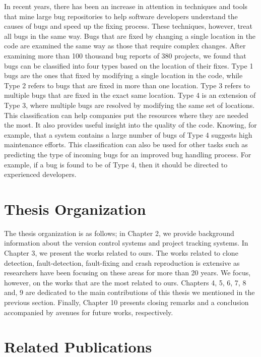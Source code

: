 \documentclass[12pt]{report}
\begin{document}
\begin{enumerate}
  In recent years, there has been an increase in attention in techniques
  and tools that mine large bug repositories to help software developers
  understand the causes of bugs and speed up the fixing process. These
  techniques, however, treat all bugs in the same way. Bugs that are
  fixed by changing a single location in the code are examined the same
  way as those that require complex changes. After examining more than
  100 thousand bug reports of 380 projects, we found that bugs can be
  classified into four types based on the location of their fixes. Type
  1 bugs are the ones that fixed by modifying a single location in the
  code, while Type 2 refers to bugs that are fixed in more than one
  location. Type 3 refers to multiple bugs that are fixed in the exact
  same location. Type 4 is an extension of Type 3, where multiple bugs
  are resolved by modifying the same set of locations. This
  classification can help companies put the resources where they are
  needed the most. It also provides useful insight into the quality of
  the code. Knowing, for example, that a system contains a large number
  of bugs of Type 4 suggests high maintenance efforts. This
  classification can also be used for other tasks such as predicting the
  type of incoming bugs for an improved bug handling process. For
  example, if a bug is found to be of Type 4, then it should be directed
  to experienced developers.
\end{enumerate}

\section{Thesis Organization}\label{thesis-organization}

The thesis organization is as follows; in Chapter 2, we provide
background information about the version control systems and project
tracking systems. In Chapter 3, we present the works related to ours.
The works related to clone detection, fault-detection, fault-fixing and
crash reproduction is extensive as researchers have been focusing on
these areas for more than 20 years. We focus, however, on the works that
are the most related to ours. Chapters 4, 5, 6, 7, 8 and, 9 are
dedicated to the main contributions of this thesis we mentioned in the
previous section. Finally, Chapter 10 presents closing remarks and a
conclusion accompanied by avenues for future works, respectively.

\section{Related Publications}\label{related-publications}
\end{document}
